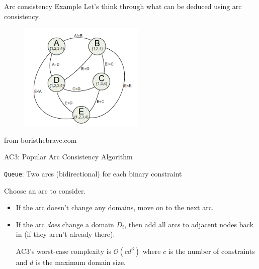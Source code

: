 \documentclass{beamer}
\begin{document}
\begin{frame}{Arc consistency Example}
    Let's think through what can be deduced using arc consistency.

    \begin{figure}
        \includegraphics[width=6cm]{images/boris_arc_consistency}
    \end{figure}

    \tiny{from boristhebrave.com}
    
\end{frame}

\begin{frame}{AC3: Popular Arc Consistency Algorithm}

    \texttt{Queue}: Two arcs (bidirectional) for each binary constraint

    \vspace{.1in}
    Choose an arc to consider.
    \begin{itemize}
        \item If the arc doesn't change any domains, move on to the next arc.
        \item If the arc {\em does} change a domain $D_i$, then add all arcs to 
        adjacent nodes back in (if they aren't already there). 
        
        
        AC3's worst-case complexity is $\mathcal{O}(cd^3)$ where $c$ is the number of 
        constraints and $d$ is the maximum domain size.
    \end{itemize}
\end{frame}
\end{document}
